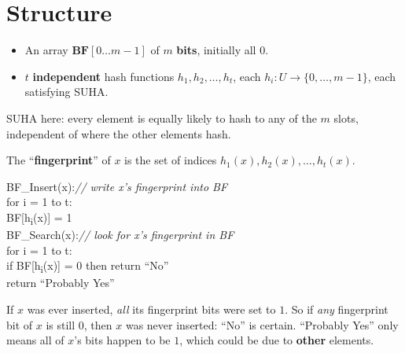 \documentclass[11pt]{article}
\begin{document}
\section{Structure}

\begin{defbox}
\begin{itemize}[leftmargin=1.4em,itemsep=2pt]
  \item An array $\mathbf{BF}[0 \ldots m-1]$ of $m$ \textbf{bits}, initially all $0$.
  \item $t$ \textbf{independent} hash functions $h_1, h_2, \ldots, h_t$, each $h_i : U \to \{0, \ldots, m-1\}$, each satisfying SUHA.
\end{itemize}
SUHA here: every element is equally likely to hash to any of the $m$ slots, independent of where the other elements hash.
\end{defbox}

\begin{defbox}[Fingerprint]
The ``\textbf{fingerprint}'' of $x$ is the set of indices $h_1(x), h_2(x), \ldots, h_t(x)$.
\end{defbox}

\begin{codebox}
\ttfamily BF\_Insert(x):\hfill \textnormal{\itshape // write x's fingerprint into BF}\\
\ttfamily \hspace*{1.5em}for i = 1 to t:\\
\ttfamily \hspace*{3em}BF[h\textsubscript{i}(x)] = 1\\[4pt]
\ttfamily BF\_Search(x):\hfill \textnormal{\itshape // look for x's fingerprint in BF}\\
\ttfamily \hspace*{1.5em}for i = 1 to t:\\
\ttfamily \hspace*{3em}if BF[h\textsubscript{i}(x)] = 0 then return ``No''\\
\ttfamily \hspace*{1.5em}return ``Probably Yes''
\end{codebox}

\begin{keybox}
If $x$ was ever inserted, \emph{all} its fingerprint bits were set to $1$. So if \emph{any} fingerprint bit of $x$ is still $0$, then $x$ was never inserted: ``No'' is certain. ``Probably Yes'' only means all of $x$'s bits happen to be $1$, which could be due to \textbf{other} elements.
\end{keybox}
\end{document}
